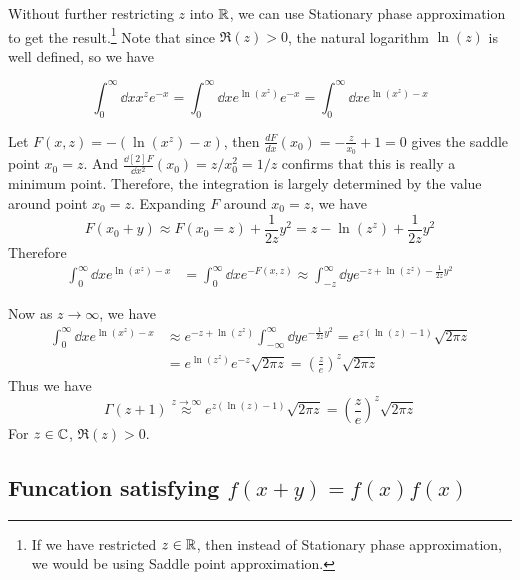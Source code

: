 Without further restricting $z$ into $\mathbb{R}$, we can use Stationary phase approximation
to get the result.\footnote{
    If we have restricted $z\in\mathbb{R}$, then instead of Stationary phase
approximation, we would be using Saddle point approximation.}
Note that since $\Re(z)>0$, the natural logarithm $\ln(z)$ is well
defined, so we have

\begin{equation}
    \int_0^\infty \dd{x} x^z e^{-x} = 
    \int_0^\infty \dd{x} e^{\ln(x^z)} e^{-x} = 
    \int_0^\infty \dd{x} e^{\ln(x^z)-x} 
\end{equation}

Let $F(x,z) = -(\ln(x^z)-x)$, then $\frac{dF}{dx}(x_0)=-\frac{z}{x_0}+1=0$ gives the
saddle point $x_0=z$. And $\frac{\dd[2]{F}}{\dd x^2}(x_0)=z/x_0^2=1/z$
confirms that this is really a minimum point. Therefore, the integration is
largely determined by the value around point $x_0=z$. Expanding $F$ around
$x_0=z$, we have
\begin{equation}
    F(x_0 + y)\approx F(x_0=z) + \frac{1}{2z} y^2 
    = z-\ln(z^z) + \frac{1}{2z}y^2
\end{equation}
Therefore
\begin{align}
    \int_0^\infty \dd{x} e^{\ln(x^z)-x} &= 
    \int_0^\infty \dd{x} e^{-F(x,z)} \approx
    \int_{-z}^\infty \dd{y} e^{-z+\ln(z^z) - \frac{1}{2z}y^2}
\end{align}

Now as $z\to\infty$, we have
\begin{align}
    \int_0^\infty \dd{x} e^{\ln(x^z)-x}
    &\approx e^{-z+\ln(z^z)} \int_{-\infty}^\infty \dd{y} e^{- \frac{1}{2z}y^2} 
    = e^{z(\ln(z)-1)} \sqrt{2\pi z} \nonumber\\
    &= e^{\ln(z^z)}e^{-z}\sqrt{2\pi z}
    = (\frac{z}{e})^z \sqrt{2\pi z}
\end{align}
Thus we have
\begin{equation}
    \Gamma(z+1) \overset{z\to\infty}{\approx} e^{z(\ln(z)-1)} \sqrt{2\pi z}
    = (\frac{z}{e})^z \sqrt{2\pi z}
\end{equation}
For $z\in\mathbb{C}$, $\Re(z)>0$.
\subsection{Funcation satisfying \texorpdfstring{$f(x+y)=f(x)f(x)$}{}}
\label{sec:Funcation satisfying \texorpdfstring{$f(x+y)=f(x)f(x)$}{}}

